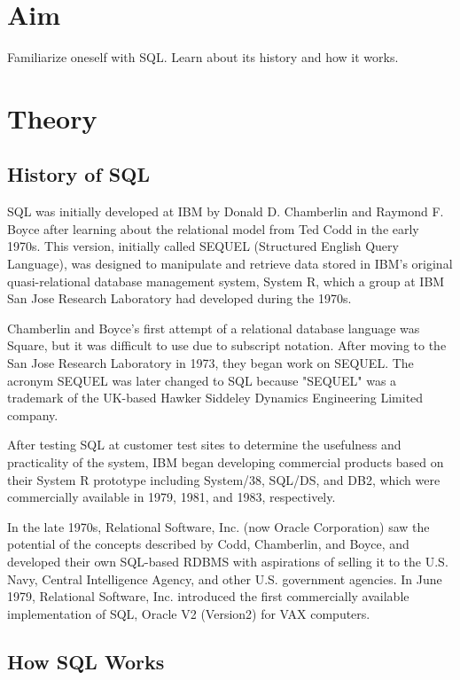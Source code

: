 \section{Aim}
 Familiarize oneself with SQL. Learn about its history and how it works.

\section{{Theory}}

\subsection{History of SQL}

SQL was initially developed at IBM by Donald D. Chamberlin and Raymond F. Boyce after learning about the relational model from Ted Codd in the early 1970s. This version, initially called SEQUEL (Structured English Query Language), was designed to manipulate and retrieve data stored in IBM's original quasi-relational database management system, System R, which a group at IBM San Jose Research Laboratory had developed during the 1970s.

Chamberlin and Boyce's first attempt of a relational database language was Square, but it was difficult to use due to subscript notation. After moving to the San Jose Research Laboratory in 1973, they began work on SEQUEL. The acronym SEQUEL was later changed to SQL because "SEQUEL" was a trademark of the UK-based Hawker Siddeley Dynamics Engineering Limited company.

After testing SQL at customer test sites to determine the usefulness and practicality of the system, IBM began developing commercial products based on their System R prototype including System/38, SQL/DS, and DB2, which were commercially available in 1979, 1981, and 1983, respectively.

In the late 1970s, Relational Software, Inc. (now Oracle Corporation) saw the potential of the concepts described by Codd, Chamberlin, and Boyce, and developed their own SQL-based RDBMS with aspirations of selling it to the U.S. Navy, Central Intelligence Agency, and other U.S. government agencies. In June 1979, Relational Software, Inc. introduced the first commercially available implementation of SQL, Oracle V2 (Version2) for VAX computers.

\subsection{How SQL Works}

